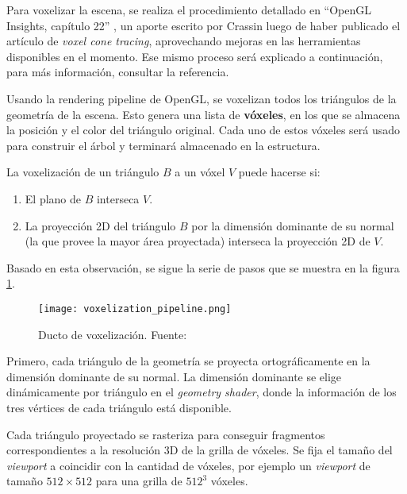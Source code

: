 Para voxelizar la escena, se realiza el procedimiento detallado en ``OpenGL Insights, capítulo 22'' \cite{opengl-insights}, un aporte escrito por Crassin luego de haber publicado el artículo de \textit{voxel cone tracing}, aprovechando mejoras en las herramientas disponibles en el momento.
Ese mismo proceso será explicado a continuación, para más información, consultar la referencia.

Usando la rendering pipeline de OpenGL, se voxelizan todos los triángulos de la geometría de la escena.
Esto genera una lista de \textbf{vóxeles}, en los que se almacena la posición y el color del triángulo original.
Cada uno de estos vóxeles será usado para construir el árbol y terminará almacenado en la estructura.

La voxelización de un triángulo $B$ a un vóxel $V$ puede hacerse si:

\begin{enumerate}
    \item El plano de $B$ interseca $V$.
    \item La proyección 2D del triángulo $B$ por la dimensión dominante de su normal (la que provee la mayor área proyectada) interseca la proyección 2D de $V$.
\end{enumerate}

Basado en esta observación, se sigue la serie de pasos que se muestra en la figura \ref{fig:voxelization_pipeline}.

\begin{figure}[h!]
    \centering
    \texttt{[image: voxelization\_pipeline.png]}
    \caption{Ducto de voxelización. Fuente: \cite{opengl-insights}}
    \label{fig:voxelization_pipeline}
\end{figure}

Primero, cada triángulo de la geometría se proyecta ortográficamente en la dimensión dominante de su normal.
La dimensión dominante se elige dinámicamente por triángulo en el \textit{geometry shader}, donde la información de los tres vértices de cada triángulo está disponible.

Cada triángulo proyectado se rasteriza para conseguir fragmentos correspondientes a la resolución 3D de la grilla de vóxeles.
Se fija el tamaño del \textit{viewport} a coincidir con la cantidad de vóxeles, por ejemplo un \textit{viewport} de tamaño $512\times512$ para una grilla de $512^3$ vóxeles.

